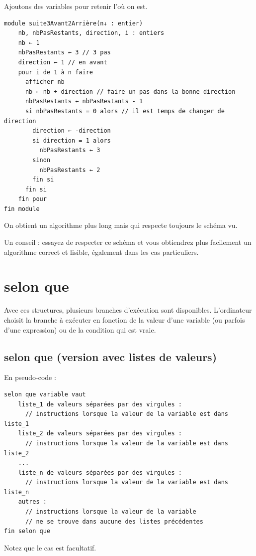 \documentclass[11pt,a4paper]{article}
\begin{document}
            \par
        
        Ajoutons des variables pour retenir l' o\`u on est.
      
            \par
        \begin{verbatim}
module suite3Avant2Arrière(n↓ : entier)
    nb, nbPasRestants, direction, i : entiers
    nb ← 1
    nbPasRestants ← 3 // 3 pas
    direction ← 1 // en avant
    pour i de 1 à n faire
      afficher nb
      nb ← nb + direction // faire un pas dans la bonne direction
      nbPasRestants ← nbPasRestants - 1
      si nbPasRestants = 0 alors // il est temps de changer de direction
        direction ← -direction
        si direction = 1 alors
          nbPasRestants ← 3
        sinon
          nbPasRestants ← 2
        fin si
      fin si
    fin pour
fin module
      \end{verbatim}
        On obtient un algorithme plus long mais qui respecte toujours le sch\'ema vu.
      
            \par
        
        Un conseil : essayez de respecter ce sch\'ema et vous obtiendrez plus facilement un algorithme
        correct et lisible, \'egalement dans les cas particuliers.
      
            \par
        \section{selon que}Avec ces structures, plusieurs branches d'ex\'ecution sont disponibles. L'ordinateur choisit la
    branche \`a ex\'ecuter en fonction de la valeur d'une variable (ou parfois d'une expression) ou
    de la condition qui est vraie.\subsection{selon que (version avec listes de valeurs)}En pseudo-code :
            \par
        \begin{verbatim}
selon que variable vaut
    liste_1 de valeurs séparées par des virgules :
      // instructions lorsque la valeur de la variable est dans liste_1
    liste_2 de valeurs séparées par des virgules :
      // instructions lorsque la valeur de la variable est dans liste_2
    ...
    liste_n de valeurs séparées par des virgules :
      // instructions lorsque la valeur de la variable est dans liste_n
    autres :
      // instructions lorsque la valeur de la variable
      // ne se trouve dans aucune des listes précédentes
fin selon que
      \end{verbatim}Notez que le cas \verb@autres@ est facultatif.
            \par
        
\end{document}

